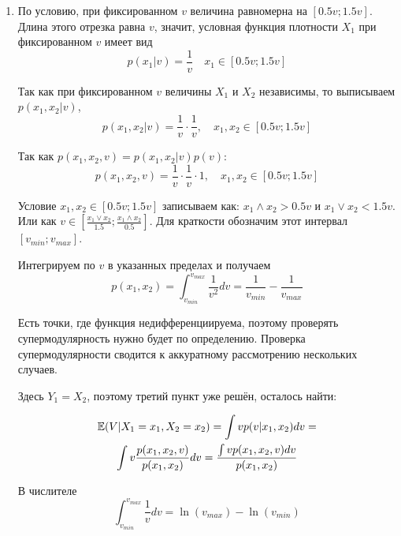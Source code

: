 \begin{enumerate}


\item  По условию, при фиксированном $ v $ величина равномерна на $ [0.5v;1.5v] $. Длина этого отрезка равна $ v $, значит, условная функция плотности $ X_{1} $ при фиксированном $ v $ имеет вид 
\begin{equation}
p(x_{1}|v)=\frac{1}{v}\quad x_{1}\in [0.5v;1.5v]
\end{equation}


Так как при фиксированном $ v $ величины $X_{1}  $ и $ X_{2} $ независимы, то выписываем $ p(x_{1},x_{2}|v) $,
\begin{equation}
p(x_{1},x_{2}|v)=\frac{1}{v}\cdot \frac{1}{v}, \quad x_{1},x_{2}\in [0.5v;1.5v]
\end{equation}

Так как $ p(x_{1},x_{2},v)=p(x_{1},x_{2}|v)p(v) $:
\begin{equation}
p(x_{1},x_{2},v)=\frac{1}{v}\cdot \frac{1}{v}\cdot 1, \quad x_{1},x_{2}\in [0.5v;1.5v]
\end{equation}

Условие $ x_{1},x_{2}\in [0.5v;1.5v] $ записываем как: $ x_{1}\wedge x_{2} > 0.5v $ и $ x_{1}\vee x_{2} <1.5v $. Или как $ v\in [\frac{x_{1}\vee x_{2}}{1.5};\frac{x_{1}\wedge x_{2}}{0.5}] $. Для краткости обозначим этот интервал $[v_{min};v_{max}]$.

Интегрируем по $ v $ в указанных пределах и получаем
\begin{equation}
p(x_{1},x_{2})=\int_{v_{min}}^{v_{max}}\frac{1}{v^{2}}dv=\frac{1}{v_{min}}-\frac{1}{v_{max}}
\end{equation}

Есть точки, где функция недифференциируема, поэтому проверять супермодулярность нужно будет по определению. Проверка супермодулярности сводится к аккуратному рассмотрению нескольких случаев.

Здесь $ Y_{1}=X_{2} $, поэтому третий пункт уже решён, осталось найти:

\begin{multline}
\operatorname{\mathbb{E}}(V|X_{1}=x_{1}, X_{2}=x_{2})=\int v p(v|x_{1},x_{2})dv=\\
\int v \frac{p(x_{1},x_{2},v)}{p(x_{1},x_{2})} dv=\frac{\int v p(x_{1},x_{2},v) dv }{p(x_{1},x_{2})}
\end{multline}

В числителе
\begin{equation}
\int_{v_{min}}^{v_{max}}\frac{1}{v}dv=\ln(v_{max})-\ln(v_{min})
\end{equation}


\end{enumerate}
